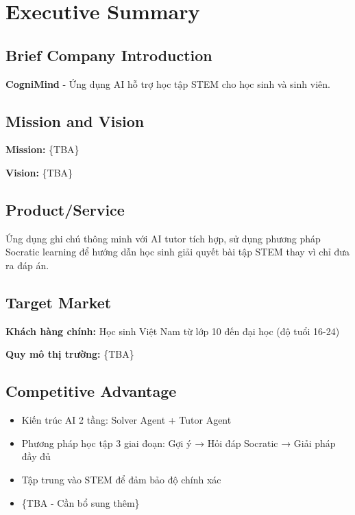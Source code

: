 \section{Executive Summary}

\subsection{Brief Company Introduction}
\textbf{CogniMind} - Ứng dụng AI hỗ trợ học tập STEM cho học sinh và sinh viên.

\subsection{Mission and Vision}
\textbf{Mission:} \{TBA\}

\textbf{Vision:} \{TBA\}

\subsection{Product/Service}
Ứng dụng ghi chú thông minh với AI tutor tích hợp, sử dụng phương pháp Socratic learning để hướng dẫn học sinh giải quyết bài tập STEM thay vì chỉ đưa ra đáp án.

\subsection{Target Market}
\textbf{Khách hàng chính:} Học sinh Việt Nam từ lớp 10 đến đại học (độ tuổi 16-24)

\textbf{Quy mô thị trường:} \{TBA\}

\subsection{Competitive Advantage}
\begin{itemize}
    \item Kiến trúc AI 2 tầng: Solver Agent + Tutor Agent
    \item Phương pháp học tập 3 giai đoạn: Gợi ý → Hỏi đáp Socratic → Giải pháp đầy đủ
    \item Tập trung vào STEM để đảm bảo độ chính xác
    \item \{TBA - Cần bổ sung thêm\}
\end{itemize}

